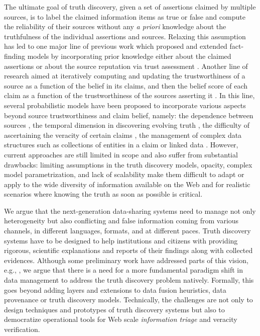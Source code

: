 \documentclass[prodmode,acmtecs]{acmsmall} %
\begin{document}
The ultimate goal of truth discovery, given a set of assertions claimed by multiple sources, is to label the claimed information items as true or false and compute the reliability of 
their sources without any {\it a priori} knowledge about the truthfulness of the individual assertions and sources.
Relaxing this assumption has led to one major line of previous work which proposed and extended fact-finding 
models by incorporating prior knowledge either about the claimed assertions \cite{PasternackR13} or about the source 
reputation via trust assessment \cite{BalakrishnanK11}. Another line of research aimed at iteratively computing 
and updating the trustworthiness of a source as a function of the belief in its claims, and then the belief score of each 
claim as a function of the trustworthiness of the 
sources asserting it \cite{YinHY08}. In this line, several probabilistic models have been proposed to incorporate various aspects beyond source 
trustworthiness and claim belief, namely: the dependence between sources \cite{DongBHS10a}, the temporal 
dimension in discovering evolving truth  \cite{DongBS09a}, the difficulty of ascertaining the veracity of certain claims \cite{GallandAMS10}, 
the management of complex  data structures such as collections of entities in a claim \cite{ZhaoRGH12} or linked data \cite{GoasdoueKKLMZ13}.
 However, current approaches are still limited in scope and also suffer from substantial drawbacks: limiting  
 assumptions in the truth discovery models, opacity, complex model parametrization, and lack of scalability  make them difficult to adapt or apply to the 
 wide diversity of information available on the Web and for realistic scenarios where knowing the truth as soon as possible is critical. 




 We argue that the next-generation data-sharing systems need to manage not only heterogeneity but also conflicting and false 
 information  coming from various channels, in different languages, formats, and at different paces. Truth discovery systems  have to be designed to help institutions and citizens with providing rigorous, scientific explanations and reports 
 of their findings along with collected evidences. %
  Although some preliminary work have addressed parts of this vision, e.g., \cite{DongS2013,DongBHS10a,LiDLMS12}, we argue that there is a need for a more fundamental paradigm shift in data management  to address the truth discovery problem natively. Formally, this goes beyond adding layers and extensions to data fusion heuristics, data provenance or truth discovery models. Technically, the challenges are not only to  design techniques and prototypes of truth discovery systems but also to democratize operational tools for Web scale {\it information  triage} and veracity verification.
  
\end{document}
